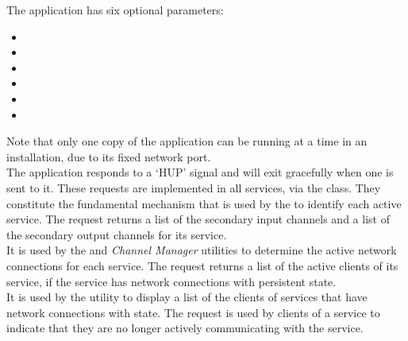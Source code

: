 The application has six optional parameters:
\begin{itemize}
\item\exSp{}
\item{}
\item\exSp{}
\item\exSp{}
\item\exSp{}
\item\exSp{}
\end{itemize}
Note that only one copy of the 
application can be running at a time in an \mplusm{} installation, due to its fixed
\yarp{} network port.\\

The  application responds to a `HUP'
signal and will exit gracefully when one is sent to it.
\secondaryEnd{}
These requests are implemented in all \mplusm{} services, via the
 class.
They constitute the fundamental mechanism that is used by the
 to identify each active service.
The  request returns a list of the secondary input
channels and a list of the secondary output channels for its service.\\

It is used by the  and \emph{Channel Manager} utilities to
determine the active \yarp{} network connections for each service.
The  request returns a list of the active clients of
its service, if the service has \yarp{} network connections with persistent state.\\

It is used by the  utility to display a list of the clients
of services that have \yarp{} network connections with state.
The  request is used by clients of a service to
indicate that they are no longer actively communicating with the service.\\

